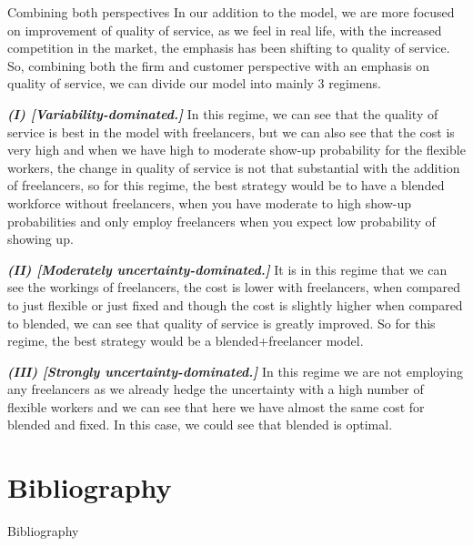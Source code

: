 \documentclass[8pt]{beamer}
\begin{document}
\begin{frame}{Combining both perspectives}
In our addition to the model, we are more focused on improvement of quality of service, as we feel in real life, with the increased competition in the market, the emphasis has been shifting to quality of service. So, combining both the firm and customer perspective with an emphasis on quality of service, we can divide our model into mainly 3 regimens. \bigskip

\textbf{ \textit {(I) [Variability-dominated.]}} In this regime, we can see that the quality of service is best in the model with freelancers, but we can also see that the cost is very high and when we have high to moderate show-up probability for the flexible workers, the change in quality of service is not that substantial with the addition of freelancers, so for this regime, the best strategy would be to have a blended workforce without freelancers, when you have moderate to high show-up probabilities and only employ freelancers when you expect low probability of showing up. \bigksip

\textbf{ \textit {(II) [Moderately uncertainty-dominated.]}}
It is in this regime that we can see the workings of freelancers, the cost is lower with freelancers, when compared to just flexible or just fixed and though the cost is slightly higher when compared to blended, we can see that quality of service is greatly improved. So for this regime, the best strategy would be a blended+freelancer model. \bigskip

\textbf{ \textit {(III) [Strongly uncertainty-dominated.]}}
In this regime we are not employing any freelancers as we already hedge the uncertainty with a  high number of flexible workers and we can see that here we have almost the same cost for blended and fixed. In this case, we could see that blended is optimal.
\end{frame}

\section{Bibliography}
\begin{frame}{Bibliography}
    

\end{frame}
\end{document}
